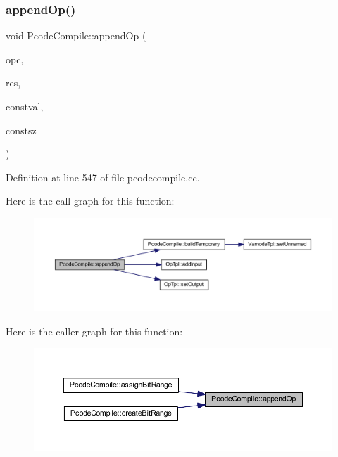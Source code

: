 \subsubsection{\texorpdfstring{appendOp()}{appendOp()}}
{\footnotesize\ttfamily void Pcode\+Compile\+::append\+Op (\begin{DoxyParamCaption}\item[{\mbox{\hyperlink{opcodes_8hh_abeb7dfb0e9e2b3114e240a405d046ea7}{Op\+Code}}}]{opc,  }\item[{\mbox{\hyperlink{class_expr_tree}{Expr\+Tree}} $\ast$}]{res,  }\item[{\mbox{\hyperlink{types_8h_a2db313c5d32a12b01d26ac9b3bca178f}{uintb}}}]{constval,  }\item[{int4}]{constsz }\end{DoxyParamCaption})}



Definition at line 547 of file pcodecompile.\+cc.

Here is the call graph for this function\+:
\nopagebreak
\begin{figure}[H]
\begin{center}
\leavevmode
\includegraphics[width=350pt]{class_pcode_compile_a2f916c4254dca29203c7cb530d35cae8_cgraph}
\end{center}
\end{figure}
Here is the caller graph for this function\+:
\nopagebreak
\begin{figure}[H]
\begin{center}
\leavevmode
\includegraphics[width=350pt]{class_pcode_compile_a2f916c4254dca29203c7cb530d35cae8_icgraph}
\end{center}
\end{figure}
\mbox{\label{class_pcode_compile_a2ba1215fdd8b357164b6271282f1f808}} 
